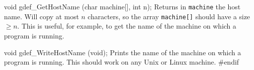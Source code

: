 \code

void gdef_GetHostName (char machine[], int n);
\endcode
  \tab Returns in \texttt{machine} the host name.
  Will copy at most $n$ characters, so the array \texttt{machine[]}
  should have a size $\ge n$. This is useful, for example,
  to get the name of the machine on which a program is running.
  \endtab
\code


void gdef_WriteHostName (void);
\endcode
  \tab Prints the name of the machine on which a program is running.
   This should work on any Unix or Linux machine.
  \endtab
\hide
\code
#endif
\endcode
\endhide
